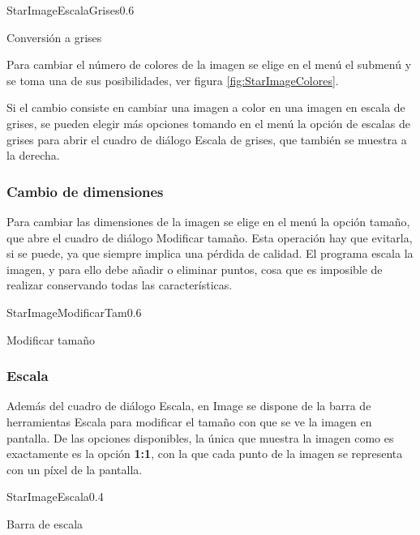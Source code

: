 \begin{figura}{StarImageEscalaGrises}{0.6}
\caption{Conversión a grises}
\label{fig:StarImageEscalaGrises}
\end{figura}


Para cambiar el número de colores de la imagen se elige en el menú  el submenú 
 y se toma una de sus posibilidades, ver figura 
\ref{fig:StarImageColores}.



Si el cambio consiste en cambiar una imagen a color en una imagen en escala de grises, se pueden
elegir más opciones tomando en el menú  la opción  de escalas de grises
para abrir el cuadro de diálogo Escala de grises, que también se muestra a la derecha.


\subsubsection{Cambio de dimensiones}
Para cambiar las dimensiones de la imagen se elige en el menú  la opción 
tamaño, que abre el cuadro de diálogo Modificar tamaño. Esta operación hay que evitarla, si se puede, ya que
siempre implica una pérdida de calidad. El programa escala la imagen, y para ello debe añadir o eliminar 
puntos, cosa que es imposible de realizar conservando todas las características.

\begin{figura}{StarImageModificarTam}{0.6}
\caption{Modificar tamaño}
\label{fig:StarImageModificarTam}
\end{figura}


\subsubsection{Escala}
Además del cuadro de diálogo Escala, en Image se dispone de la barra de herramientas Escala para modificar 
el tamaño con que se ve la imagen en pantalla. De las opciones disponibles, la única que muestra la imagen 
como es exactamente es la opción \textbf{1:1}, con la que cada punto de la imagen se representa con un píxel
de la pantalla.

\begin{figura}{StarImageEscala}{0.4}
\caption{Barra de escala}
\label{fig:StarImageEscala}
\end{figura}

